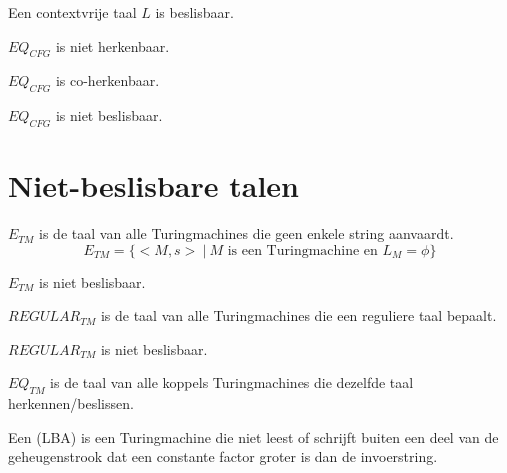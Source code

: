 \documentclass[main.tex]{subfiles}
\begin{document}
\begin{st}
  Een contextvrije taal $L$ is beslisbaar.

\end{st}

\begin{st}
  $EQ_{CFG}$ is niet herkenbaar.
\end{st}

\begin{st}
  $EQ_{CFG}$ is co-herkenbaar.
\end{st}

\begin{gev}
  $EQ_{CFG}$ is niet beslisbaar.
\end{gev}

\section{Niet-beslisbare talen}
\label{sec:niet-besl-talen}

\begin{de}
  \label{de:e-tm}
  $E_{TM}$ is de taal van alle Turingmachines die geen enkele string aanvaardt.
  \[ E_{TM} = \{ <M,s>\ |\ M \text{ is een Turingmachine en } L_{M} = \phi \} \]
\end{de}

\begin{st}
  $E_{TM}$ is niet beslisbaar.
\end{st}

\begin{de}
  \label{de:regular-tm}
  $REGULAR_{TM}$ is de taal van alle Turingmachines die een reguliere taal bepaalt.
\end{de}

\begin{st}
  $REGULAR_{TM}$ is niet beslisbaar.
\end{st}

\begin{de}
  \label{de:eq-tm}
  $EQ_{TM}$ is de taal van alle koppels Turingmachines die dezelfde taal herkennen/beslissen.
\end{de}

\begin{de}
  Een  (LBA) is een Turingmachine die niet leest of schrijft buiten een deel van de geheugenstrook dat een constante factor groter is dan de invoerstring.
\end{de}
\end{document}
